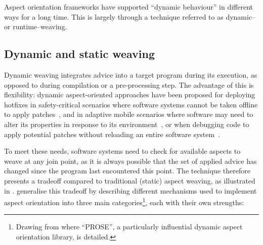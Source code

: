 
Aspect orientation frameworks have supported ``dynamic behaviour'' in different
ways for a long time. This is largely through a technique referred to as dynamic–
or runtime–weaving. 


\subsection{Dynamic and static weaving}

Dynamic weaving integrates advice into a target program during its execution, as
opposed to during compilation or a pre-processing step. The advantage of this is
flexibility: dynamic aspect-oriented approaches have been proposed for deploying
hotfixes in safety-critical scenarios where software systems cannot be taken
offline to apply patches~\cite{Ionescu_2009}, and in adaptive mobile scenarios
where software may need to alter its properties in response to its
environment~\cite{hveding2005aspect}, or when debugging code to apply potential
patches without reloading an entire software system~\cite{popovici2002PROSE}.

To meet these needs, software systems need to check for available aspects to
weave at any join point, as it is always possible that the set of applied advice
has changed since the program last encountered this point. The technique
therefore presents a tradeoff compared to traditional (static) aspect weaving,
as illustrated in \cite{dynamicAOchitchyan}. \citeauthor{dynamicAOchitchyan}
generalise this tradeoff by describing different mechanisms used to implement
aspect orientation into three main categories\footnote{Drawing from
\cite{popovici2002PROSE,popovici2003JITaspects} where ``PROSE'', a particularly
influential dynamic aspect orientation library, is detailed.}, each with their own
strengths:


